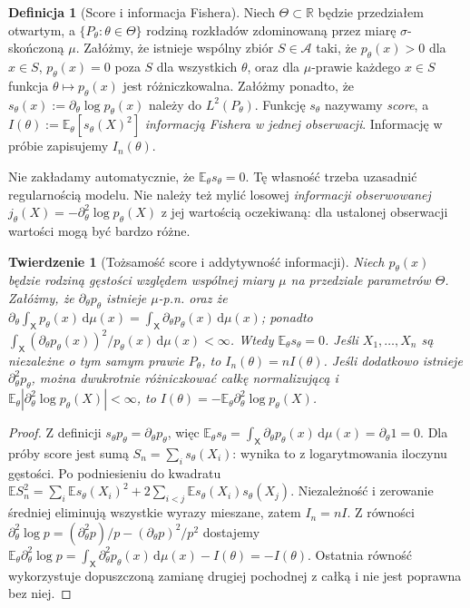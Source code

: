 \documentclass[11pt,a4paper,oneside]{report}
\numberwithin{equation}{chapter}
\theoremstyle{plain}
\newtheorem{twierdzenie}{Twierdzenie}[chapter]
\theoremstyle{definition}
\newtheorem{definicja}{Definicja}[chapter]
\theoremstyle{remark}
\newcommand{\R}{\mathbb R}
\newcommand{\E}{\mathbb E}
\newcommand{\dd}{\mathrm d}
\begin{document}
\begin{definicja}[Score i informacja Fishera]\label{def:fisher-score}
Niech $\Theta\subset\R$ będzie przedziałem otwartym, a
$\{P_\theta:\theta\in\Theta\}$ rodziną rozkładów zdominowaną
przez miarę $\sigma$-skończoną $\mu$. Załóżmy, że istnieje wspólny zbiór $S\in\mathcal A$
taki, że $p_\theta(x)>0$ dla $x\in S$, $p_\theta(x)=0$
poza $S$ dla wszystkich $\theta$, oraz dla $\mu$-prawie
każdego $x\in S$ funkcja $\theta\mapsto p_\theta(x)$
jest różniczkowalna. Załóżmy ponadto, że
$s_\theta(x):=\partial_\theta\log p_\theta(x)$ należy do
$L^2(P_\theta)$. Funkcję $s_\theta$ nazywamy \emph{score}, a
$I(\theta):=\E_\theta[s_\theta(X)^2]$ \emph{informacją Fishera
w jednej obserwacji}. Informację w próbie zapisujemy $I_n(\theta)$.
\end{definicja}

Nie zakładamy automatycznie, że $\E_\theta s_\theta=0$.
Tę własność trzeba uzasadnić regularnością modelu. Nie należy też
mylić losowej \emph{informacji obserwowanej}
$j_\theta(X)=-\partial_\theta^2\log p_\theta(X)$ z jej
wartością oczekiwaną: dla ustalonej obserwacji wartości mogą być
bardzo różne.

\begin{twierdzenie}[Tożsamość score i addytywność informacji]
\label{thm:score-information}
Niech $p_\theta(x)$ będzie rodziną gęstości względem wspólnej
miary $\mu$ na przedziale parametrów $\Theta$. Załóżmy, że
$\partial_\theta p_\theta$ istnieje $\mu$-p.n. oraz że
$\partial_\theta\int_{\mathsf X} p_\theta(x)\,\dd\mu(x)
=\int_{\mathsf X}\partial_\theta p_\theta(x)\,\dd\mu(x)$; ponadto
$\int_{\mathsf X}(\partial_\theta p_\theta(x))^2/p_\theta(x)\,\dd\mu(x)<\infty$.
Wtedy $\E_\theta s_\theta=0$. Jeśli $X_1,\ldots,X_n$ są
niezależne o tym samym prawie $P_\theta$, to
$I_n(\theta)=nI(\theta)$.
Jeśli dodatkowo istnieje $\partial_\theta^2p_\theta$,
można dwukrotnie różniczkować całkę normalizującą i
$\E_\theta|\partial_\theta^2\log p_\theta(X)|<\infty$,
to $I(\theta)=-\E_\theta\partial_\theta^2\log p_\theta(X)$.
\end{twierdzenie}
\begin{proof}
Z definicji $s_\theta p_\theta=\partial_\theta p_\theta$,
więc $\E_\theta s_\theta=\int_{\mathsf X}\partial_\theta p_\theta(x)
\,\dd\mu(x)=\partial_\theta1=0$. Dla próby score jest sumą
$S_n=\sum_i s_\theta(X_i)$: wynika to z logarytmowania
iloczynu gęstości. Po podniesieniu do kwadratu
$\E S_n^2=\sum_i\E s_\theta(X_i)^2+
2\sum_{i<j}\E s_\theta(X_i)s_\theta(X_j)$.
Niezależność i zerowanie średniej eliminują wszystkie wyrazy
mieszane, zatem $I_n=nI$.
Z równości $\partial_\theta^2\log p=(\partial_\theta^2p)/p-
(\partial_\theta p)^2/p^2$ dostajemy
$\E_\theta\partial_\theta^2\log p=
\int_{\mathsf X}\partial_\theta^2p_\theta(x)\,\dd\mu(x)-I(\theta)=-I(\theta)$.
Ostatnia równość wykorzystuje dopuszczoną zamianę drugiej
pochodnej z całką i nie jest poprawna bez niej.
\end{proof}
\end{document}
